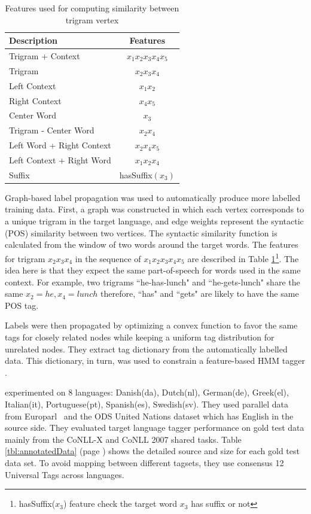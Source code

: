 \begin{table}
\centering
    \begin{tabular}{lc}
    Description               & Features          \\\hline
    Trigram + Context         & $x_1x_2x_3x_4x_5$ \\
    Trigram                   & $x_2x_3x_4$       \\
    Left Context              & $x_1x_2$          \\
    Right Context             & $x_4x_5$          \\
    Center Word               & $x_3$             \\
    Trigram - Center Word     & $x_2x_4$          \\
    Left Word + Right Context & $x_2x_4x_5$       \\
    Left Context + Right Word & $x_1x_2x_4$       \\
    Suffix                    & hasSuffix$(x_3)$  \\
    \end{tabular}
    \caption{Features used for computing similarity between trigram vertex}
    \label{tbl:featuresForSimilarity}
\end{table}
Graph-based label propagation was used to automatically produce more labelled training data. First, a graph was constructed in which each vertex corresponds to a unique trigram in the target language, and edge weights represent the syntactic (POS) similarity between two vertices. The syntactic similarity function is calculated from the window of two words around the target words. The features for trigram $x_2x_3x_4$ in the sequence of $x_1x_2x_3x_4x_5$ are described in Table \ref{tbl:featuresForSimilarity}\footnote{hasSuffix($x_3$) feature check the target word $x_3$ has suffix or not}. The idea here is that they expect the same part-of-speech for words used in the same context. For example, two trigrams ``he-has-lunch" and ``he-gets-lunch" share the same $x_2 = he, x_4 = lunch$ therefore, ``has" and ``gets" are likely to have the same POS tag. 

Labels were then propagated by optimizing a convex function to favor
the same tags for closely related nodes while keeping a uniform tag
distribution for unrelated nodes. They extract tag dictionary from the automatically labelled data. This dictionary, in  turn, was used to constrain a
feature-based HMM tagger \cite{featurebaseHMM}.

  experimented on 8 languages: Danish(da), Dutch(nl), German(de), Greek(el), Italian(it), Portuguese(pt), Spanish(es), Swedish(sv). They used parallel data from Europarl~\cite{europarl} and the ODS United Nations dataset which has English in the source side. They evaluated target language tagger performance on gold test data mainly from the CoNLL-X and CoNLL 2007 shared tasks. Table \ref{tbl:annotatedData} (page \pageref{tbl:annotatedData}) shows the detailed source and size for each gold test data set. To avoid mapping between different tagsets, they use consensus 12 Universal Tags \cite{UniversalTagSet} across languages. 

